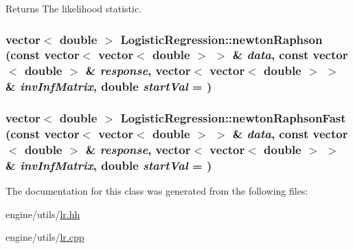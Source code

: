 \begin{DoxyReturn}{Returns}
The likelihood statistic. 
\end{DoxyReturn}
\hypertarget{classLogisticRegression_a298d29d0539412141a1e98205d1c4396}{
\subsubsection[{newtonRaphson}]{\setlength{\rightskip}{0pt plus 5cm}vector$<$ double $>$ LogisticRegression::newtonRaphson (const vector$<$ vector$<$ double $>$ $>$ \& {\em data}, \/  const vector$<$ double $>$ \& {\em response}, \/  vector$<$ vector$<$ double $>$ $>$ \& {\em invInfMatrix}, \/  double {\em startVal} = {})}}
\label{classLogisticRegression_a298d29d0539412141a1e98205d1c4396}
\hypertarget{classLogisticRegression_a1724e4c7cc9a73db2712dbbbb9fbf204}{
\subsubsection[{newtonRaphsonFast}]{\setlength{\rightskip}{0pt plus 5cm}vector$<$ double $>$ LogisticRegression::newtonRaphsonFast (const vector$<$ vector$<$ double $>$ $>$ \& {\em data}, \/  const vector$<$ double $>$ \& {\em response}, \/  vector$<$ vector$<$ double $>$ $>$ \& {\em invInfMatrix}, \/  double {\em startVal} = {})}}
\label{classLogisticRegression_a1724e4c7cc9a73db2712dbbbb9fbf204}


The documentation for this class was generated from the following files:\begin{DoxyCompactItemize}
\item 
engine/utils/\hyperlink{lr_8hh}{lr.hh}\item 
engine/utils/\hyperlink{lr_8cpp}{lr.cpp}\end{DoxyCompactItemize}

